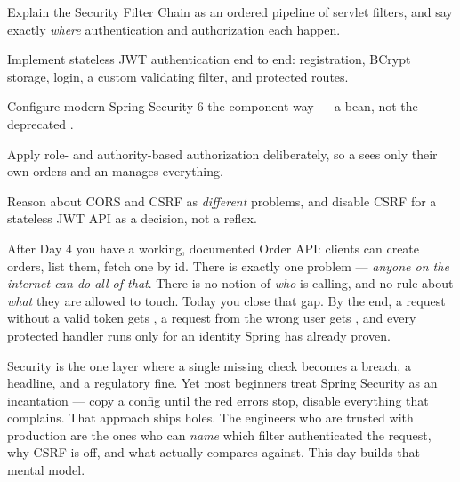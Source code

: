 
\begin{objectives}
\begin{wbitem}
  \item Explain the Security Filter Chain as an ordered pipeline of servlet filters, and say exactly \emph{where} authentication and authorization each happen.
  \item Implement stateless JWT authentication end to end: registration, BCrypt storage, login, a custom validating filter, and protected routes.
  \item Configure modern Spring Security 6 the component way --- a  bean, not the deprecated .
  \item Apply role- and authority-based authorization deliberately, so a  sees only their own orders and an  manages everything.
  \item Reason about CORS and CSRF as \emph{different} problems, and disable CSRF for a stateless JWT API as a decision, not a reflex.
\end{wbitem}
\end{objectives}


 After Day 4 you have a working, documented Order API: clients can create orders, list them, fetch one by id. There is exactly one problem --- \emph{anyone on the internet can do all of that}. There is no notion of \emph{who} is calling, and no rule about \emph{what} they are allowed to touch. Today you close that gap. By the end, a request without a valid token gets , a request from the wrong user gets , and every protected handler runs only for an identity Spring has already proven.

 Security is the one layer where a single missing check becomes a breach, a headline, and a regulatory fine. Yet most beginners treat Spring Security as an incantation --- copy a config until the red errors stop, disable everything that complains. That approach ships holes. The engineers who are trusted with production are the ones who can \emph{name} which filter authenticated the request, why CSRF is off, and what  actually compares against. This day builds that mental model.

